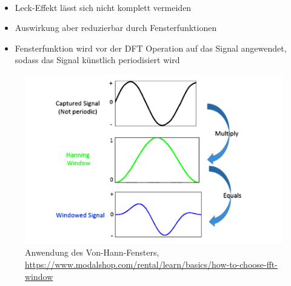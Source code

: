 \begin{frame}{\insertsection}
	\framesubtitle{\insertsubsection}
	
	\begin{itemize}
		\vspace{1em}
		\item Leck-Effekt lässt sich nicht komplett vermeiden
		\item Auswirkung aber reduzierbar durch Fensterfunktionen
		\item Fensterfunktion wird vor der DFT Operation auf das Signal angewendet, sodass das Signal
				  künstlich periodisiert wird
	\end{itemize}
	\begin{figure}
		\centering
		\includegraphics[scale=0.4]{images/appliedWindowFunction2.jpg}
		\caption*{\centering Anwendung des Von-Hann-Fensters,\\ \href{https://www.modalshop.com/rental/learn/basics/how-to-choose-fft-window}{\tiny https://www.modalshop.com/rental/learn/basics/how-to-choose-fft-window}}
	\end{figure}
\end{frame}














 
